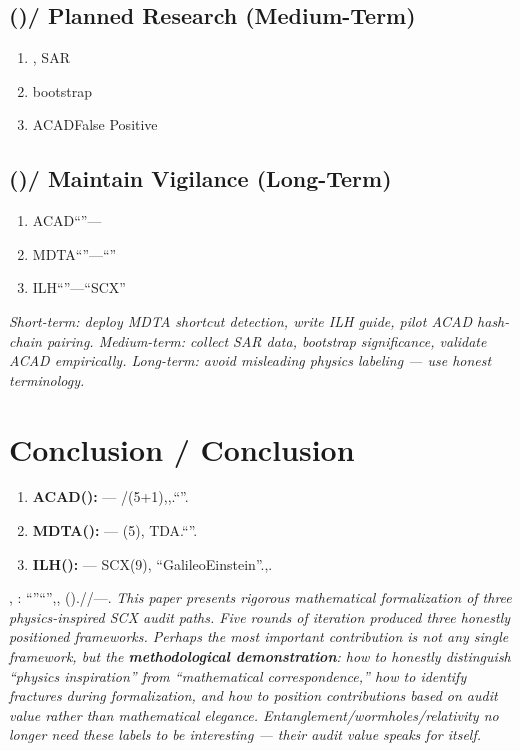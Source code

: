 \documentclass[11pt,a4paper]{article}
\theoremstyle{plain}
\theoremstyle{definition}
\theoremstyle{remark}
\begin{document}
{\subsection{()/ Planned Research (Medium-Term)}
\begin{enumerate}[leftmargin=*]
 \item, SAR
 \item bootstrap
 \item ACADFalse Positive
\end{enumerate}
\subsection{()/ Maintain Vigilance (Long-Term)}
\begin{enumerate}[leftmargin=*]
 \item ACAD``''---
 \item MDTA``''---``''
 \item ILH``''---``SCX''
\end{enumerate}
\textit{Short-term: deploy MDTA shortcut detection, write ILH guide, pilot ACAD hash-chain pairing. Medium-term: collect SAR data, bootstrap significance, validate ACAD empirically. Long-term: avoid misleading physics labeling --- use honest terminology.}
\newpage
\section{Conclusion / Conclusion}
\label{sec:conclusion}
\begin{enumerate}[leftmargin=*]
 \item \textbf{ACAD(): } --- /(5+1),,.``''.
 \item \textbf{MDTA(): } --- (5), TDA.``''.
 \item \textbf{ILH(): } --- SCX(9), ``GalileoEinstein''.,.
\end{enumerate}
\noindent, : ``''``'',, ().//---.
\textit{This paper presents rigorous mathematical formalization of three physics-inspired SCX audit paths. Five rounds of iteration produced three honestly positioned frameworks. Perhaps the most important contribution is not any single framework, but the \textbf{methodological demonstration}: how to honestly distinguish ``physics inspiration'' from ``mathematical correspondence,'' how to identify fractures during formalization, and how to position contributions based on audit value rather than mathematical elegance. Entanglement/wormholes/relativity no longer need these labels to be interesting --- their audit value speaks for itself.}
\newpage
\appendix
}
\end{document}
